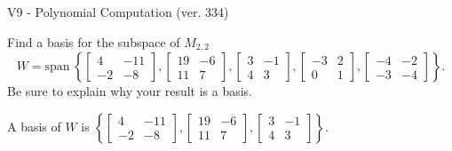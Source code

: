 \begin{exercise}
  \begin{exerciseTitle}V9 - Polynomial Computation (ver. 334)\end{exerciseTitle}
  \begin{exerciseStatement}
    Find a basis for the subspace of \(M_{2,2}\) 
\[W=\mathrm{span}\ \left\{\left[\begin{array}{cc}
4 & -11 \\
-2 & -8
\end{array}\right] , \left[\begin{array}{cc}
19 & -6 \\
11 & 7
\end{array}\right] , \left[\begin{array}{cc}
3 & -1 \\
4 & 3
\end{array}\right] , \left[\begin{array}{cc}
-3 & 2 \\
0 & 1
\end{array}\right] , \left[\begin{array}{cc}
-4 & -2 \\
-3 & -4
\end{array}\right]\right\}.\]
 Be sure to explain why your result is a basis.


  \end{exerciseStatement}
  \begin{exerciseAnswer}
   A basis of \(W\) is  \(\left\{\left[\begin{array}{cc}
4 & -11 \\
-2 & -8
\end{array}\right] , \left[\begin{array}{cc}
19 & -6 \\
11 & 7
\end{array}\right] , \left[\begin{array}{cc}
3 & -1 \\
4 & 3
\end{array}\right]\right\}\).
  


  \end{exerciseAnswer}
\end{exercise}